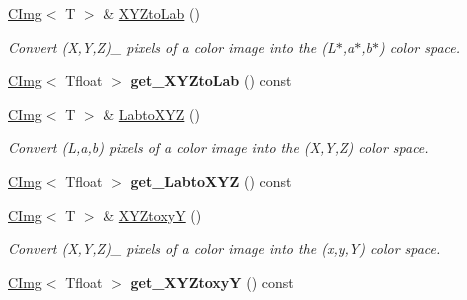 \begin{DoxyCompactItemize}
\item 
\hypertarget{structcimg__library_1_1CImg_a13d44ab14b2f1f34ae150e5ead0a381e}{
\hyperlink{structcimg__library_1_1CImg}{CImg}$<$ T $>$ \& \hyperlink{structcimg__library_1_1CImg_a13d44ab14b2f1f34ae150e5ead0a381e}{XYZtoLab} ()}
\label{structcimg__library_1_1CImg_a13d44ab14b2f1f34ae150e5ead0a381e}

\begin{DoxyCompactList}\small\item\em Convert (X,Y,Z)\_ pixels of a color image into the (L$\ast$,a$\ast$,b$\ast$) color space. \item\end{DoxyCompactList}\item 
\hypertarget{structcimg__library_1_1CImg_afedef7c2fb7a2d5fad9599909d9f8544}{
\hyperlink{structcimg__library_1_1CImg}{CImg}$<$ Tfloat $>$ {\bfseries get\_\-XYZtoLab} () const }
\label{structcimg__library_1_1CImg_afedef7c2fb7a2d5fad9599909d9f8544}

\item 
\hypertarget{structcimg__library_1_1CImg_a875c1681e84375ceb5d828e20de61704}{
\hyperlink{structcimg__library_1_1CImg}{CImg}$<$ T $>$ \& \hyperlink{structcimg__library_1_1CImg_a875c1681e84375ceb5d828e20de61704}{LabtoXYZ} ()}
\label{structcimg__library_1_1CImg_a875c1681e84375ceb5d828e20de61704}

\begin{DoxyCompactList}\small\item\em Convert (L,a,b) pixels of a color image into the (X,Y,Z) color space. \item\end{DoxyCompactList}\item 
\hypertarget{structcimg__library_1_1CImg_a12f61116848bc071b961f0e301d8c820}{
\hyperlink{structcimg__library_1_1CImg}{CImg}$<$ Tfloat $>$ {\bfseries get\_\-LabtoXYZ} () const }
\label{structcimg__library_1_1CImg_a12f61116848bc071b961f0e301d8c820}

\item 
\hypertarget{structcimg__library_1_1CImg_a697f3a725fd9e0349362d927ce95fd6e}{
\hyperlink{structcimg__library_1_1CImg}{CImg}$<$ T $>$ \& \hyperlink{structcimg__library_1_1CImg_a697f3a725fd9e0349362d927ce95fd6e}{XYZtoxyY} ()}
\label{structcimg__library_1_1CImg_a697f3a725fd9e0349362d927ce95fd6e}

\begin{DoxyCompactList}\small\item\em Convert (X,Y,Z)\_ pixels of a color image into the (x,y,Y) color space. \item\end{DoxyCompactList}\item 
\hypertarget{structcimg__library_1_1CImg_ae719be7d6b6d5b5771f64adc2e95970a}{
\hyperlink{structcimg__library_1_1CImg}{CImg}$<$ Tfloat $>$ {\bfseries get\_\-XYZtoxyY} () const }
\label{structcimg__library_1_1CImg_ae719be7d6b6d5b5771f64adc2e95970a}


\end{DoxyCompactItemize}
